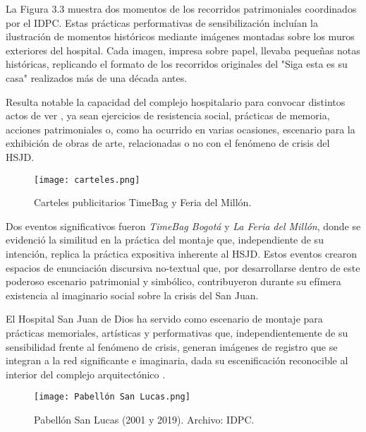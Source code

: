 La Figura 3.3 muestra dos momentos de los recorridos patrimoniales coordinados por el IDPC. Estas prácticas performativas de sensibilización \parencite{Guasch2011} incluían la ilustración de momentos históricos mediante imágenes montadas sobre los muros exteriores del hospital. Cada imagen, impresa sobre papel, llevaba pequeñas notas históricas, replicando el formato de los recorridos originales del "Siga esta es su casa" realizados más de una década antes.

Resulta notable la capacidad del complejo hospitalario para convocar distintos actos de ver \parencite{Abril2007}, ya sean ejercicios de resistencia social, prácticas de memoria, acciones patrimoniales o, como ha ocurrido en varias ocasiones, escenario para la exhibición de obras de arte, relacionadas o no con el fenómeno de crisis del HSJD.

\begin{figure}[h]
    \centering
    \texttt{[image: carteles.png]}
    \caption{Carteles publicitarios TimeBag y Feria del Millón.}
\end{figure}

Dos eventos significativos fueron \textit{TimeBag Bogotá} y \textit{La Feria del Millón}, donde se evidenció la similitud en la práctica del montaje que, independiente de su intención, replica la práctica expositiva inherente al HSJD. Estos eventos crearon espacios de enunciación discursiva no-textual que, por desarrollarse dentro de este poderoso escenario patrimonial y simbólico, contribuyeron durante su efímera existencia al imaginario social sobre la crisis del San Juan.

El Hospital San Juan de Dios ha servido como escenario de montaje para prácticas memoriales, artísticas y performativas que, independientemente de su sensibilidad frente al fenómeno de crisis, generan imágenes de registro que se integran a la red significante e imaginaria, dada su escenificación reconocible al interior del complejo arquitectónico \parencite{BuckMorss1989}.

\begin{figure}[h]
    \texttt{[image: Pabellón San Lucas.png]}
    \caption{Pabellón San Lucas (2001 y 2019). Archivo: IDPC.}
\end{figure}



